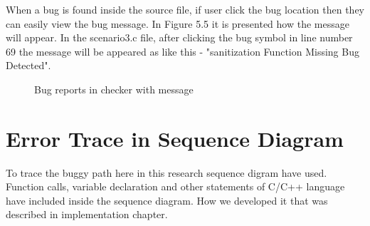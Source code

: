 When a bug is found inside the source file, if user click the bug location then they can easily view the bug message. In Figure 5.5 it is presented how the message will appear. In the scenario3.c file,
after clicking the bug symbol in line number 69 the message will be appeared as like this - "sanitization
Function Missing Bug Detected".

\begin{figure}[htbp]
	\centering
	\label{fig:bugDetectionWithMessage}
	\caption{Bug reports in checker with message}
\end{figure}

\section{Error Trace in Sequence Diagram}

To trace the buggy path here in this research sequence digram have used. Function calls, variable declaration and other statements of C/C++ language have included inside the sequence diagram. How we developed it that was described in implementation chapter. 

